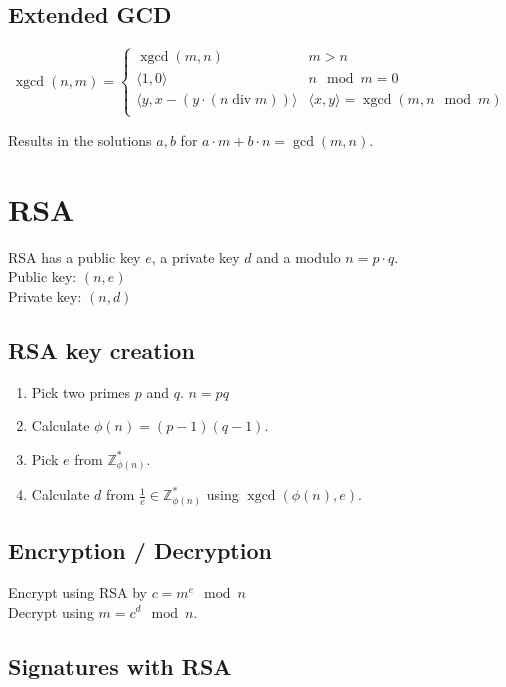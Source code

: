 \documentclass{article}
\newcommand{\ZZ}{\mathbb{Z}}
\newcommand{\Z}{\ZZ}
\newcommand{\egcd}{\operatorname{xgcd}}
\begin{document}
\subsection{Extended GCD}

\[
  \egcd(n,m) = \begin{cases}
    \egcd(m,n) & m > n \\
    \langle 1,0 \rangle & n \mod m = 0 \\
    \langle y, x - (y \cdot (n \operatorname{div} m))\rangle & \langle x, y \rangle = \egcd(m, n \mod m) \\
  \end{cases}
\]

Results in the solutions $a,b$ for $a \cdot m + b \cdot n = \gcd(m,n)$.

\section{RSA}

RSA has a public key $e$, a private key $d$ and a modulo $n=p\cdot q$. \\
Public key: $(n, e)$\\
Private key: $(n,d)$ \\

\subsection{RSA key creation}
\begin{enumerate}
  \item Pick two primes $p$ and $q$. $n=pq$
  \item Calculate $\phi(n) = (p-1)(q-1)$.
  \item Pick $e$ from $\Z^*_{\phi(n)}$.
  \item Calculate $d$ from $\frac{1}{e} \in \Z^*_{\phi(n)}$ using $\egcd(\phi(n),e)$.
\end{enumerate}

\subsection{Encryption / Decryption}
Encrypt using RSA by $c = m^e \mod n$\\
Decrypt using $m = c^d \mod n$.

\subsection{Signatures with RSA}
\end{document}
